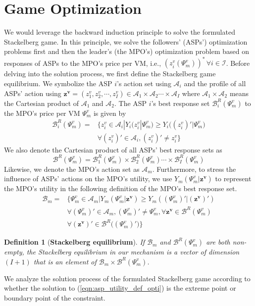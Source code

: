 \documentclass[conference]{IEEEtran}
\newtheorem{definition}{Definition}
\begin{document}
\section{Game Optimization} \label{sec:game_optimization}
We would leverage the backward induction principle to solve the formulated Stackelberg game. In this principle, we solve the followers' (ASPs') optimization problems first and then the leader's (the MPO's) optimization problem based on responses of ASPs to the MPO's price per VM, i.e., $(z_i^v(\Psi_m^v))^* \, \forall i \in \mathcal{I}$. Before delving into the solution process, we first define the Stackelberg game equilibrium. We symbolize the ASP $i$'s action set using $\mathcal{A}_i$ and the profile of all ASPs' action using $\bm{z^v}=(z_1^v, z_2^v, \cdots, z_I^v) \in \mathcal{A}_1 \times \mathcal{A}_2 \cdots \times \mathcal{A}_I$ where $\mathcal{A}_1 \times \mathcal{A}_2$ means the Cartesian product of $\mathcal{A}_1$ and $\mathcal{A}_2$. The ASP $i$'s best response set $\mathcal{B}_i^R(\Psi_m^v)$ to the MPO's price per VM $\Psi_m^v$ is given by
\begin{equation} \label{eqn:asp_best_response}
\begin{aligned}
\mathcal{B}_i^R(\Psi_m^v) = &\{z_i^v \in \mathcal{A}_i |Y_i(z_i^v|\Psi_m^v) \geq Y_i\big((z_i^v)'|\Psi_m^v\big) \\
&\forall (z_i^v)' \in \mathcal{A}_i, (z_i^v)' \neq z_i^v\}
\end{aligned}
\end{equation}
We also denote the Cartesian product of all ASPs' best response sets as
\begin{equation}
\mathcal{B}^R(\Psi_m^v) = \mathcal{B}_1^R(\Psi_m^v) \times \mathcal{B}_2^R(\Psi_m^v) \cdots \times \mathcal{B}_I^R(\Psi_m^v)
\end{equation}
Likewise, we denote the MPO's action set as $\mathcal{A}_m$. Furthermore, to stress the influence of ASPs' actions on the MPO's utility, we use $Y_m(\Psi_m^v|\bm{z^v})$ to represent the MPO's utility in the following definition of the MPO's best response set.
\begin{equation} \label{eqn:mpo_best_response}
\begin{aligned}
\mathcal{B}_m = &\{\Psi_m^v \in \mathcal{A}_m| Y_m(\Psi_m^v|\bm{z^v}) \geq Y_m((\Psi_m^v)'|(\bm{z^v})') \\
&\forall (\Psi_m^v)' \in \mathcal{A}_m, (\Psi_m^v)' \neq \Psi_m^v, \forall \bm{z^v} \in \mathcal{B}^R(\Psi_m^v) \\
&\forall  (\bm{z^v})' \in \mathcal{B}^R\big((\Psi_m^v)'\big)\}
\end{aligned}
\end{equation}
\begin{definition}[\textbf{Stackelberg equilibrium}] \label{def:stackelberg_equilibrium}
If $\mathcal{B}_{m}$ and $\mathcal{B}^R(\Psi_m^v)$ are both non-empty, the Stackelberg equilibrium in our mechanism is a vector of dimension $(I+1)$ that is an element of $\mathcal{B}_m  \times \mathcal{B}^R(\Psi_m^v)$.
\end{definition}
We analyze the solution process of the formulated Stackelberg game according to whether the solution to (\ref{eqn:asp_utility_def_opti}) is the extreme point or boundary point of the constraint.
\end{document}
